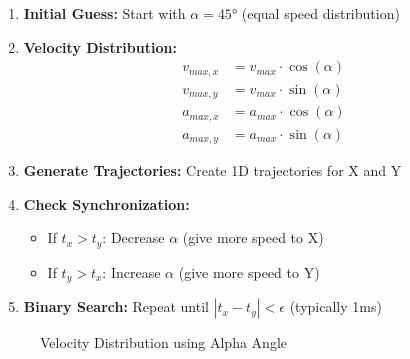 \documentclass[12pt,a4paper]{article}
\begin{document}
\begin{enumerate}
    \item \textbf{Initial Guess:} Start with $\alpha = 45°$ (equal speed distribution)
    \item \textbf{Velocity Distribution:}
    \begin{align}
        v_{max,x} &= v_{max} \cdot \cos(\alpha) \\
        v_{max,y} &= v_{max} \cdot \sin(\alpha) \\
        a_{max,x} &= a_{max} \cdot \cos(\alpha) \\
        a_{max,y} &= a_{max} \cdot \sin(\alpha)
    \end{align}
    
    \item \textbf{Generate Trajectories:} Create 1D trajectories for X and Y
    
    \item \textbf{Check Synchronization:}
    \begin{itemize}
        \item If $t_x > t_y$: Decrease $\alpha$ (give more speed to X)
        \item If $t_y > t_x$: Increase $\alpha$ (give more speed to Y)
    \end{itemize}
    
    \item \textbf{Binary Search:} Repeat until $|t_x - t_y| < \epsilon$ (typically 1ms)
\end{enumerate}

\begin{figure}[H]
\centering
{}
\caption{Velocity Distribution using Alpha Angle}
\end{figure}
\end{document}
